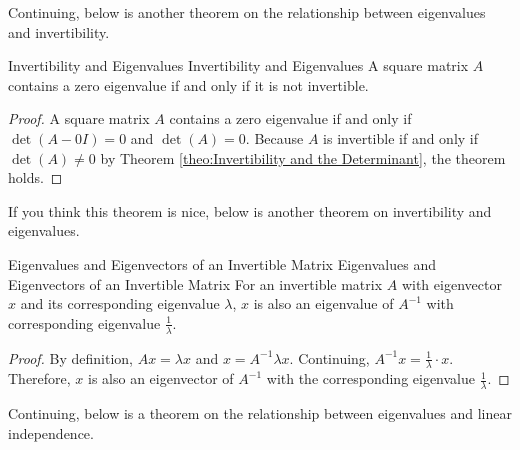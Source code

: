 \documentclass[../main.tex]{subfiles}
\begin{document}
Continuing, below is another theorem on the relationship between
eigenvalues and invertibility.

\begin{theorem}{Invertibility and Eigenvalues}
{Invertibility and Eigenvalues}
A square matrix $A$ contains a zero eigenvalue if and only if it is
not invertible.
\end{theorem}
\begin{proof}
A square matrix $A$ contains a zero eigenvalue if and only if
$\det(A - 0 I) = 0$ and $\det(A) = 0$. Because $A$ is invertible
if and only if $\det(A) \neq 0$ by Theorem \ref{theo:Invertibility
and the Determinant}, the theorem holds.
\end{proof}

If you think this theorem is nice, below is another theorem on
invertibility and eigenvalues.

\begin{theorem}{Eigenvalues and Eigenvectors of an Invertible Matrix}
{Eigenvalues and Eigenvectors of an Invertible Matrix}
For an invertible matrix $A$ with eigenvector $x$ and its
corresponding eigenvalue $\lambda$, $x$ is also an eigenvalue of
$A^{-1}$ with corresponding eigenvalue $\frac{1}{\lambda}$.
\end{theorem}
\begin{proof}
By definition, $Ax = \lambda x$ and $x = A^{-1} \lambda x$.
Continuing, $A^{-1} x = \frac{1}{\lambda} \cdot x$. Therefore,
$x$ is also an eigenvector of $A^{-1}$ with the corresponding
eigenvalue $\frac{1}{\lambda}$.
\end{proof}

Continuing, below is a theorem on the relationship between
eigenvalues and linear independence.
\end{document}
